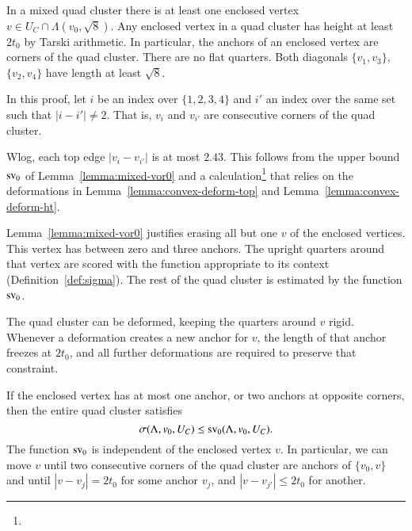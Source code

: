 \begin{proved}  
In a mixed quad cluster there is at least one enclosed vertex
$v \in U_C\cap \Lambda(v_0,\sqrt8)$.
Any enclosed vertex in a quad cluster has height at least $2t_0$
by Tarski arithmetic. In particular, the anchors of an
enclosed vertex are corners of the quad cluster. There are no flat
quarters.  Both diagonals $\{v_1,v_3\}$, $\{v_2,v_4\}$ have length
at least $\sqrt8$.


In this proof,  let $i$ be an index over $\{1,2,3,4\}$ and
$i'$ an index over the same set such that $|i-i'|\ne 2$.  That is,
$v_i$ and $v_{i'}$ are consecutive corners of the quad cluster.

Wlog, each top edge $|v_i-v_{i'}|$ is at most $2.43$.
This follows from the upper bound ${\operatorname{sv}}_0$ of Lemma~\ref{lemma:mixed-vor0}
and  a calculation\footnote{} 
that relies on the deformations in 
Lemma~\ref{lemma:convex-deform-top} and Lemma~\ref{lemma:convex-deform-ht}.

Lemma~\ref{lemma:mixed-vor0} justifies erasing 
all but one $v$ of the enclosed vertices.
This vertex has between zero and three anchors.
The upright
quarters around that vertex are scored with the function appropriate
to its context (Definition~\ref{def:sigma}).
The rest of the quad cluster is estimated by the function ${\operatorname{sv}}_0$.

The quad cluster can be deformed, keeping the quarters around $v$ rigid.  Whenever a deformation
creates a new anchor for $v$, the length of that anchor freezes at $2t_0$,
and all further deformations are required to preserve that constraint.

If the enclosed vertex has at most one anchor, or two anchors at opposite corners,
then the entire quad
cluster satisfies $$\sigma(\Lambda,v_0,U_C)\le {\operatorname{sv}}_0(\Lambda,v_0,U_C).$$
The function ${\operatorname{sv}}_0$ is independent of the enclosed
vertex $v$.  In particular, we can move $v$ until 
two consecutive  corners of the quad cluster are anchors of $\{v_0,v\}$
and until $|v-v_j|=2t_0$ for some anchor $v_j$,
and $|v-v_{j'}|\le 2t_0$ for another.


\end{proved}
